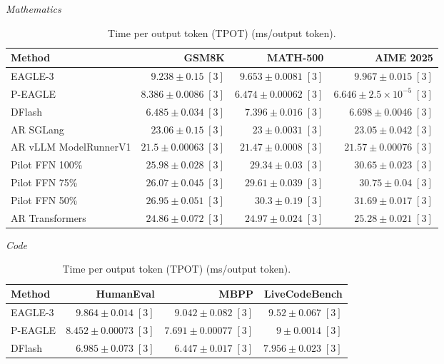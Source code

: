 \documentclass[conference,onecolumn]{IEEEtran}
\begin{document}
\begin{table}[!htp]
\centering\small
\setlength{\tabcolsep}{3pt}
\caption{Time per output token (TPOT) (ms/output token).}
\label{tab:appendix-metric-tpot-none}
\textit{Mathematics}\par\smallskip
\begin{tabular}{@{}>{\raggedright\arraybackslash}p{3.7cm}rrr@{}}
\toprule
Method & GSM8K & MATH-500 & AIME 2025 \\
\midrule
EAGLE-3 & \(9.238 \pm 0.15\;[3]\) & \(9.653 \pm 0.0081\;[3]\) & \(9.967 \pm 0.015\;[3]\) \\
P-EAGLE & \(8.386 \pm 0.0086\;[3]\) & \(\mathbf{6.474} \pm 0.00062\;[3]\) & \(\mathbf{6.646} \pm 2.5\times 10^{-5}\;[3]\) \\
DFlash & \(\mathbf{6.485} \pm 0.034\;[3]\) & \(7.396 \pm 0.016\;[3]\) & \(6.698 \pm 0.0046\;[3]\) \\
AR \textperiodcentered{} SGLang & \(23.06 \pm 0.15\;[3]\) & \(23 \pm 0.0031\;[3]\) & \(23.05 \pm 0.042\;[3]\) \\
AR \textperiodcentered{} vLLM ModelRunnerV1 & \(21.5 \pm 0.00063\;[3]\) & \(21.47 \pm 0.0008\;[3]\) & \(21.57 \pm 0.00076\;[3]\) \\
Pilot FFN 100\% & \(25.98 \pm 0.028\;[3]\) & \(29.34 \pm 0.03\;[3]\) & \(30.65 \pm 0.023\;[3]\) \\
Pilot FFN 75\% & \(26.07 \pm 0.045\;[3]\) & \(29.61 \pm 0.039\;[3]\) & \(30.75 \pm 0.04\;[3]\) \\
Pilot FFN 50\% & \(26.95 \pm 0.051\;[3]\) & \(30.3 \pm 0.19\;[3]\) & \(31.69 \pm 0.017\;[3]\) \\
AR \textperiodcentered{} Transformers & \(24.86 \pm 0.072\;[3]\) & \(24.97 \pm 0.024\;[3]\) & \(25.28 \pm 0.021\;[3]\) \\
\bottomrule
\end{tabular}\par\medskip
\textit{Code}\par\smallskip
\begin{tabular}{@{}>{\raggedright\arraybackslash}p{3.7cm}rrr@{}}
\toprule
Method & HumanEval & MBPP & LiveCodeBench \\
\midrule
EAGLE-3 & \(9.864 \pm 0.014\;[3]\) & \(9.042 \pm 0.082\;[3]\) & \(9.52 \pm 0.067\;[3]\) \\
P-EAGLE & \(8.452 \pm 0.00073\;[3]\) & \(7.691 \pm 0.00077\;[3]\) & \(9 \pm 0.0014\;[3]\) \\
DFlash & \(\mathbf{6.985} \pm 0.073\;[3]\) & \(\mathbf{6.447} \pm 0.017\;[3]\) & \(\mathbf{7.956} \pm 0.023\;[3]\) \\

\end{tabular}
\end{table}
\end{document}
